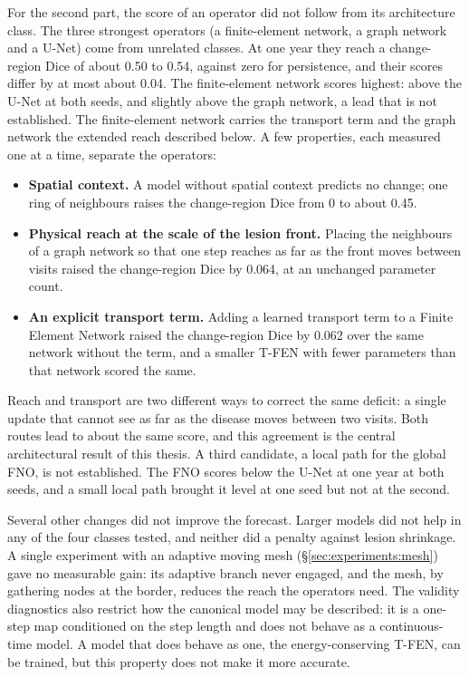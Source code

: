 For the second part, the score of an operator did not follow from its
architecture class. The three strongest operators (a finite-element
network, a graph network and a U-Net) come from unrelated classes. At one
year they reach a change-region Dice of about 0.50 to 0.54, against zero
for persistence, and their scores differ by at most about 0.04. The
finite-element network scores highest: above the U-Net at both seeds, and
slightly above the graph network, a lead that is not established. The
finite-element network carries the transport term and the graph network
the extended reach described below. A few properties, each measured one at
a time, separate the operators:
\begin{itemize}
  \item \textbf{Spatial context.} A model without spatial context predicts
    no change; one ring of neighbours raises the change-region Dice from 0
    to about 0.45.
  \item \textbf{Physical reach at the scale of the lesion front.} Placing
    the neighbours of a graph network so that one step reaches as far as
    the front moves between visits raised the change-region Dice by 0.064,
    at an unchanged parameter count.
  \item \textbf{An explicit transport term.} Adding a learned transport
    term to a Finite Element Network raised the change-region Dice by 0.062
    over the same network without the term, and a smaller T-FEN with
    fewer parameters than that network scored the same.
\end{itemize}
Reach and transport are two different ways to correct the same deficit: a
single update that cannot see as far as the disease moves between two
visits. Both routes lead to about the same score, and this agreement is
the central architectural result of this thesis. A third candidate, a local path for the global FNO,
is not established. The FNO scores below the U-Net at one year at both
seeds, and a small local path brought it level at one seed but not at the
second.

Several other changes did not improve the forecast. Larger models did not
help in any of the four classes tested, and neither did a penalty against
lesion shrinkage. A single experiment with an adaptive moving mesh
(\S\ref{sec:experiments:mesh}) gave no measurable gain: its adaptive branch
never engaged, and the mesh, by gathering nodes at the border, reduces the
reach the operators need. The validity diagnostics also restrict
how the canonical model may be described: it is a one-step map conditioned
on the step length and does not behave as a continuous-time model. A model
that does behave as one, the energy-conserving T-FEN, can be trained, but
this property does not make it more accurate.

